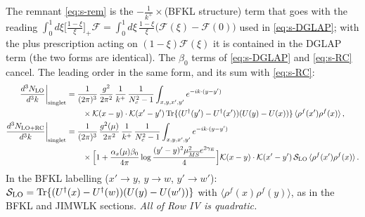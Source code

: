 The remnant \eqref{eq:s-rem} is the $-\frac{1}{k^{+}}\times$(BFKL structure) term that goes with the reading $\int_{0}^{1}d\xi\big[\frac{1-\xi}{\xi}\big]_{+}\mathcal{F}=\int_{0}^{1}d\xi\,\frac{1-\xi}{\xi}\big(\mathcal{F}(\xi)-\mathcal{F}(0)\big)$ used in \eqref{eq:s-DGLAP}; with the plus prescription acting on $(1-\xi)\mathcal{F}(\xi)$ it is contained in the DGLAP term (the two forms are identical). The $\beta_{0}$ terms of \eqref{eq:s-DGLAP} and \eqref{eq:s-RC} cancel. The leading order in the same form, and its sum with \eqref{eq:s-RC}:
\begin{align}
\frac{d^{3}N_{\rm LO}}{d^{3}k}\bigg|_{\rm singlet}&=\frac{1}{(2\pi)^{3}}\,\frac{g^{2}}{2\pi^{2}}\,\frac{1}{k^{+}}\,\frac{1}{N_{c}^{2}-1}\int_{x,y,x',y'}e^{-ik\cdot(y-y')}\notag\\&\qquad\times\mathcal{K}(x-y)\cdot\mathcal{K}(x'-y')\,{\rm Tr}\{(U^{\dagger}(y')-U^{\dagger}(x'))(U(y)-U(x))\}\,\langle\rho^{f}(x')\rho^{f}(x)\rangle\,,\label{eq:s-LO}\\
\frac{d^{3}N_{\rm LO+RC}}{d^{3}k}\bigg|_{\rm singlet}&=\frac{1}{(2\pi)^{3}}\,\frac{g^{2}(\mu)}{2\pi^{2}}\,\frac{1}{k^{+}}\,\frac{1}{N_{c}^{2}-1}\int_{x,y,x',y'}e^{-ik\cdot(y-y')}\notag\\&\qquad\times\Big[1+\frac{\alpha_{s}(\mu)\beta_{0}}{4\pi}\log\frac{(y'-y)^{2}\mu^{2}_{\overline{MS}}e^{2\gamma_{E}}}{4}\Big]\mathcal{K}(x-y)\cdot\mathcal{K}(x'-y')\,\mathcal{S}_{\rm LO}\,\langle\rho^{f}(x')\rho^{f}(x)\rangle\,.\notag
\end{align}
In the BFKL labelling ($x'\to y$, $y\to w$, $y'\to w'$): $\mathcal{S}_{\rm LO}={\rm Tr}\{(U^{\dagger}(x)-U^{\dagger}(w))(U(y)-U(w'))\}$ with $\langle\rho^{f}(x)\rho^{f}(y)\rangle$, as in the BFKL and JIMWLK sections. \emph{All of Row IV is quadratic.}


